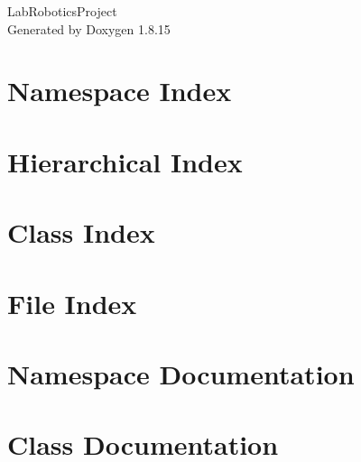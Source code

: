 \let\mypdfximage\pdfximage\def\pdfximage{\immediate\mypdfximage}\documentclass[twoside]{book}
\newcommand{\+}{\discretionary{\mbox{\scriptsize$\hookleftarrow$}}{}{}}
\newcommand{\clearemptydoublepage}{%
  \newpage{\pagestyle{empty}\cleardoublepage}%
}
\begin{document}
\hypersetup{pageanchor=false,
             bookmarksnumbered=true,
             pdfencoding=unicode
            }
\begin{titlepage}
\vspace*{7cm}
\begin{center}%
{\Large Lab\+Robotics\+Project }\\
\vspace*{1cm}
{\large Generated by Doxygen 1.8.15}\\
\end{center}
\end{titlepage}
\clearemptydoublepage
{}
\tableofcontents
\clearemptydoublepage
{}
\hypersetup{pageanchor=true}

\chapter{Namespace Index}

\chapter{Hierarchical Index}

\chapter{Class Index}

\chapter{File Index}

\chapter{Namespace Documentation}




\chapter{Class Documentation}




































\end{document}
